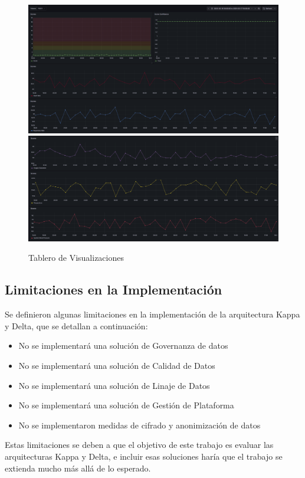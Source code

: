 \begin{figure}[h]
    \centering
    \includegraphics[width=1\textwidth]{desarrollo/visualization1.png}
    \includegraphics[width=1\textwidth]{desarrollo/visualization2.png}
    \caption{Tablero de Visualizaciones}
    \label{fig:visualization}
\end{figure}
\clearpage

\subsection{Limitaciones en la Implementación}

Se definieron algunas limitaciones en la implementación de la arquitectura Kappa y Delta, que se detallan a continuación:
\begin{itemize}
    \item No se implementará una solución de Governanza de datos
    \item No se implementará una solución de Calidad de Datos
    \item No se implementará una solución de Linaje de Datos
    \item No se implementará una solución de Gestión de Plataforma
    \item No se implementaron medidas de cifrado y anonimización de datos
\end{itemize}

Estas limitaciones se deben a que el objetivo de este trabajo es evaluar las arquitecturas Kappa y Delta,
e incluir esas soluciones haría que el trabajo se extienda mucho más allá de lo esperado.
